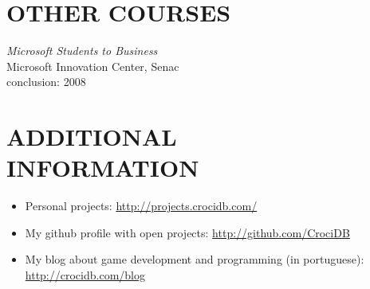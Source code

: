 \documentclass[line,margin]{res}
\begin{document}
\begin{resume}
\section{OTHER COURSES}             
           {\sl Microsoft Students to Business} \\
                Microsoft Innovation Center, Senac \\
                conclusion: 2008 


\section{ADDITIONAL \\ INFORMATION}
            \begin{itemize}  \itemsep -3pt
            \item Personal projects: \href{http://projects.crocidb.com/}{http://projects.crocidb.com/}
            \item My github profile with open projects: \href{http://github.com/CrociDB}{http://github.com/CrociDB}
            \item My blog about game development and programming (in portuguese): \href{http://crocidb.com/blog}{http://crocidb.com/blog}
            \end{itemize} 
 

\end{resume}
\end{document}
